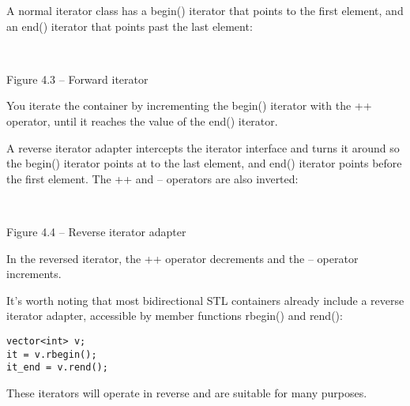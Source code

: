 A normal iterator class has a begin() iterator that points to the first element, and an end() iterator that points past the last element:

\hspace*{\fill} \\ %
\begin{center}

Figure 4.3 – Forward iterator
\end{center}

You iterate the container by incrementing the begin() iterator with the ++ operator, until it reaches the value of the end() iterator.

A reverse iterator adapter intercepts the iterator interface and turns it around so the begin() iterator points at to the last element, and end() iterator points before the first element. The ++ and -- operators are also inverted:

\hspace*{\fill} \\ %
\begin{center}

Figure 4.4 – Reverse iterator adapter
\end{center}


In the reversed iterator, the ++ operator decrements and the -- operator increments.

It's worth noting that most bidirectional STL containers already include a reverse iterator adapter, accessible by member functions rbegin() and rend():

\begin{lstlisting}[style=styleCXX]
vector<int> v;
it = v.rbegin();
it_end = v.rend();
\end{lstlisting}

These iterators will operate in reverse and are suitable for many purposes.
